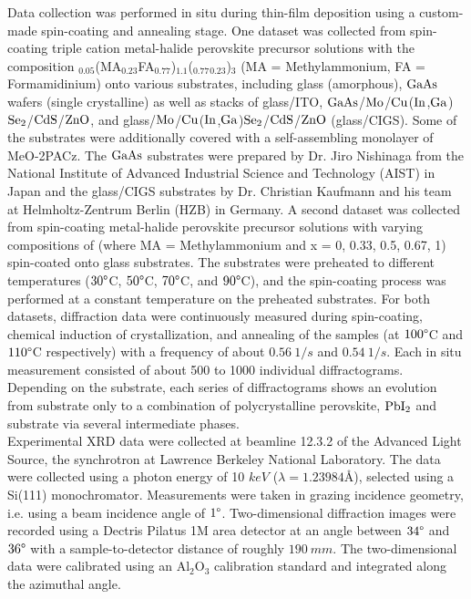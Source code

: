Data collection was performed in situ during thin-film deposition using a custom-made spin-coating and annealing stage. One dataset was collected from spin-coating triple cation metal-halide perovskite precursor solutions with the composition 
$_{0.05}$(MA$_{0.23}$FA$_{0.77}$)$_{1.1}$($_{0.77}$$_{0.23}$)$_{3}$ (MA = Methylammonium, FA = Formamidinium) onto various substrates, including glass (amorphous), $\ce{GaAs}$ wafers (single crystalline) as well as stacks of glass/ITO, $\ce{GaAs}$/$\ce{Mo}$/$\ce{Cu}$($\ce{In}$,$\ce{Ga}$)$\ce{Se2}$/$\ce{CdS}$/$\ce{ZnO}$, and glass/$\ce{Mo}$/$\ce{Cu}$($\ce{In}$,$\ce{Ga}$)$\ce{Se2}$/$\ce{CdS}$/$\ce{ZnO}$ (glass/CIGS). Some of the substrates were additionally covered with a self-assembling monolayer of MeO-2PACz. The $\ce{GaAs}$ substrates were prepared by Dr. Jiro Nishinaga from the National Institute of Advanced Industrial Science and Technology (AIST) in Japan and the glass/CIGS substrates by Dr. Christian Kaufmann and his team at Helmholtz-Zentrum Berlin (HZB) in Germany. A second dataset was collected from spin-coating metal-halide perovskite precursor solutions with varying compositions of  (where MA = Methylammonium and x = 0, 0.33, 0.5, 0.67, 1) spin-coated onto glass substrates. The substrates were preheated to different temperatures ($30\degree $C, $50\degree $C, $70\degree $C, and $90\degree $C), and the spin-coating process was performed at a constant temperature on the preheated substrates. For both datasets, diffraction data were continuously measured during spin-coating, chemical induction of crystallization, and annealing of the samples (at $100\degree$C and $110\degree$C respectively) with a frequency of about $0.56 
 \ 1/\si{s}$ and $0.54 \ 1/\si{s}$. Each in situ measurement consisted of about 500 to 1000 individual diffractograms. Depending on the substrate, each series of diffractograms shows an evolution from substrate only to a combination of polycrystalline perovskite, $\ce{PbI2}$ and substrate via several intermediate phases. \\

Experimental XRD data were collected at beamline 12.3.2 of the Advanced Light Source, the synchrotron at Lawrence Berkeley National Laboratory. The data were collected using a photon energy of 10 $\si{keV}$ ($\lambda = 1.23984 \text{\AA}$), selected using a Si(111) monochromator. Measurements were taken in grazing incidence geometry, i.e. using a beam incidence angle of $1\degree$. Two-dimensional diffraction images were recorded using a Dectris Pilatus 1M area detector at an angle between $34\degree$ and $36\degree$ with a sample-to-detector distance of roughly $190 \ \si{mm}$. The two-dimensional data were calibrated using an Al$_{2}$O$_{3}$ calibration standard and integrated along the azimuthal angle. \\


